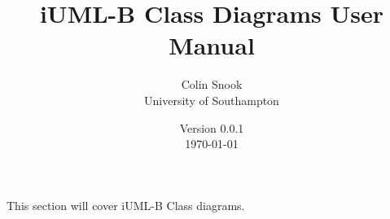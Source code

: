 \documentclass[a4paper,10pt]{article}
\title{iUML-B Class Diagrams User Manual}
\author{Colin Snook\\University of Southampton}
\date{%
	Version 0.0.1\\%
	\today%
}
\begin{document}
	\ifplastex%
	\maketitle%
	\else%
	\ifstandalone%
	\maketitle %
	\else%
	\fi%
	\fi%
	
	This section will cover iUML-B Class diagrams.
	
	
	
	
\end{document}
